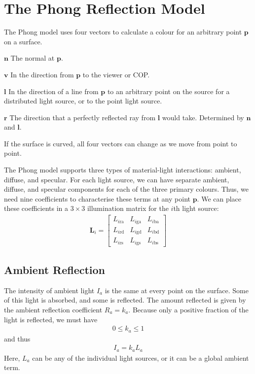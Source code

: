 \documentclass[../COS3712_Notes.tex]{subfiles}
\begin{document}
    \section{The Phong Reflection Model}
      The Phong model uses four vectors to calculate a colour for an arbitrary point $\mathbf{p}$
      on a surface.
      \begin{descriptimize}[nosep]
        \item[$\mathbf{n}$] The normal at $\mathbf{p}$.
        \item[$\mathbf{v}$] In the direction from $\mathbf{p}$ to the viewer or COP.
        \item[$\mathbf{l}$] In the direction of a line from $\mathbf{p}$ to an arbitrary point
          on the source for a distributed light source, or to the point light source.
        \item[$\mathbf{r}$] The direction that a perfectly reflected ray from $\mathbf{l}$ would
          take.
          Determined by $\mathbf{n}$ and $\mathbf{l}$.
      \end{descriptimize}
      If the surface is curved, all four vectors can change as we move from point to point.

      The Phong model supports three types of material-light interactions: ambient, diffuse,
      and specular.
      For each light source, we can have separate ambient, diffuse, and specular components
      for each of the three primary colours.
      Thus, we need nine coefficients to characterise these terms at any point $\mathbf{p}$.
      We can place these coefficients in a $3 \times 3$ illumination matrix for the $i$th
      light source:
      \begin{align*}
        \mathbf{L}_i = \begin{bmatrix}
          L_{i\mathrm{ra}} & L_{i\mathrm{ga}} & L_{i\mathrm{ba}} \\
          L_{i\mathrm{rd}} & L_{i\mathrm{gd}} & L_{i\mathrm{bd}} \\
          L_{i\mathrm{rs}} & L_{i\mathrm{gs}} & L_{i\mathrm{bs}}
        \end{bmatrix}
      \end{align*}

      \subsection{Ambient Reflection}
        The intensity of ambient light $I_a$ is the same at every point on the surface.
        Some of this light is absorbed, and some is reflected.
        The amount reflected is given by the ambient reflection coefficient $R_a = k_a$.
        Because only a positive fraction of the light is reflected,
        we must have
        \begin{align*}
          0 \leq k_a \leq 1
        \end{align*}
        and thus
        \begin{align*}
          I_a = k_a L_a
        \end{align*}
        Here, $L_a$ can be any of the individual light sources,
        or it can be a global ambient term.
\end{document}
